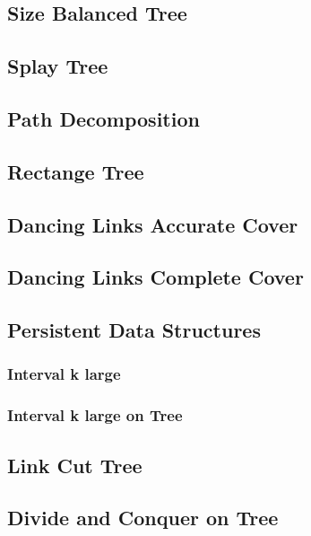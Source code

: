 \documentclass[utf8,8pt]{article}
\begin{document}
\begin{CJK}{UTF8}{gbsn}
	\subsection{Size Balanced Tree}
		
	\subsection{Splay Tree}
		
	\subsection{Path Decomposition}
		
	\subsection{Rectange Tree}
		
	\subsection{Dancing Links Accurate Cover}
		
	\subsection{Dancing Links Complete Cover}
		
	\subsection{Persistent Data Structures}
		\subsubsection{Interval k large}
			
		\subsubsection{Interval k large on Tree}
			
	\subsection{Link Cut Tree}
		
	\subsection{Divide and Conquer on Tree}
		
\clearpage
		

\end{CJK}
\end{document}
